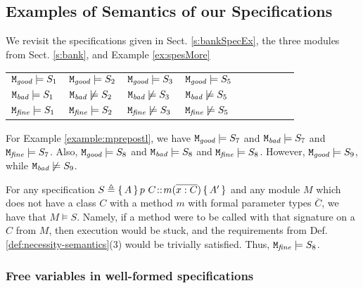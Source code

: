 \subsection{Examples of Semantics of our Specifications}

\begin{example}
 \label{example:mprepost:sat:three}
We  revisit the specifications given in Sect. \ref{s:bankSpecEx},  the three  modules from Sect. \ref{s:bank}, and Example \ref{ex:spesMore}


\begin{tabular}{lllllllll}
$\ModA  \models S_1$  &   $\ModA  \models S_2$ &   $\ModA \models S_3$    & $\ModA \models S_5$\\
 $\ModB \models S_1$  &   $\ModB \not\models S_2$   &  $\ModB  \not\models S_3$   & $\ModB \not\models S_5$ \\
 $\ModC  \models S_1$    & $\ModC \models S_2$ & $\ModC \not\models S_3$   & $\ModC \not\models S_5$ 
\end{tabular}
\end{example}
 

 
 \begin{example}
 \label{example:mprepost:sat:four}
 For  %
 Example \ref{example:mprepostl}, we have
  $\ModA \models S_7$ and $\ModB \models S_7$ and  $\ModC \models S_7$.
Also,  $\ModA \models S_8$ and $\ModB \models S_8$ and  $\ModC \models S_8$.
However,   $\ModA  \models S_9$, while $\ModB  \not\models S_9$.
\end{example}

 \begin{example}
\label{example:mprepost:sat:five}
 For  %
any   specification  $S \triangleq {\mprepost{A}{p\ C}{m}{x}{C}{A'} }$ and any module  $M$ which does not have a class $C$  with a method $m$ with formal parameter  types ${\overline C}$, we have that $M \models S$.
Namely, if a method were to be called with that signature on a $C$  from $M$, then execution would be stuck, and the requirements from Def. \ref{def:necessity-semantics}(3) would be trivially satisfied.
Thus,   $\ModC \models S_8$. %
\end{example}

\subsubsection{Free variables in well-formed specifications}
\label{wff:spec:free:more}

